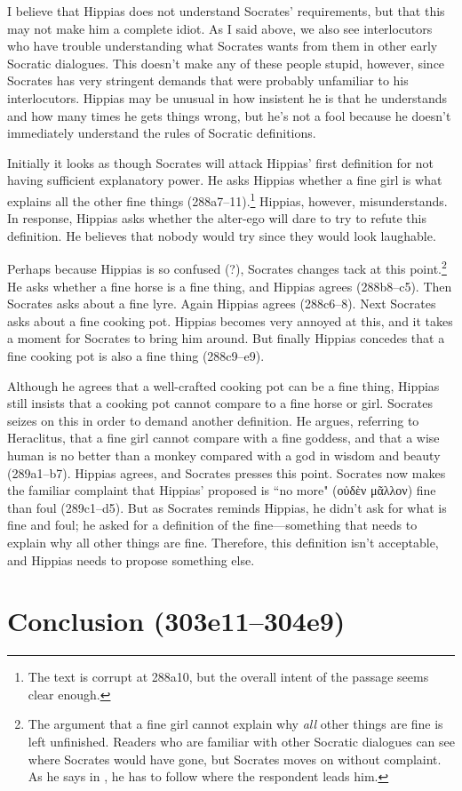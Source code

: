 \documentclass[11pt]{article}
\begin{document}
I believe that Hippias does not understand Socrates' requirements, but that this may not make him a complete idiot.  As I said above, we also see interlocutors who have trouble understanding what Socrates wants from them in other early Socratic dialogues.  This doesn't make any of these people stupid, however, since Socrates has very stringent demands that were probably unfamiliar to his interlocutors.  Hippias may be unusual in how insistent he is that he understands and how many times he gets things wrong, but he's not a fool because he doesn't immediately understand the rules of Socratic definitions.

Initially it looks as though Socrates will attack Hippias' first definition for not having sufficient explanatory power.  He asks Hippias whether a fine girl is what explains all the other fine things (288a7--11).\footnote{The text is corrupt at 288a10, but the overall intent of the passage seems clear enough.}  Hippias, however, misunderstands.  In response, Hippias asks whether the alter-ego will dare to try to refute this definition.  He believes that nobody would try since they would look laughable.

Perhaps because Hippias is so confused (?), Socrates changes tack at this point.\footnote{The argument that a fine girl cannot explain why \emph{all} other things are fine is left unfinished.  Readers who are familiar with other Socratic dialogues can see where Socrates would have gone, but Socrates moves on without complaint.  As he says in , he has to follow where the respondent leads him.}  He asks whether a fine horse is a fine thing, and Hippias agrees (288b8--c5).  Then Socrates asks about a fine lyre. Again Hippias agrees (288c6--8).  Next Socrates asks about a fine cooking pot.  Hippias becomes very annoyed at this, and it takes a moment for Socrates to bring him around.  But finally Hippias concedes that a fine cooking pot is also a fine thing (288c9--e9).

Although he agrees that a well-crafted cooking pot can be a fine thing, Hippias still insists that a cooking pot cannot compare to a fine horse or girl.  Socrates seizes on this in order to demand another definition.  He argues, referring to Heraclitus, that a fine girl cannot compare with a fine goddess, and that a wise human is no better than a monkey compared with a god in wisdom and beauty (289a1--b7).  Hippias agrees, and Socrates presses this point.  Socrates now makes the familiar complaint that Hippias' proposed  is ``no more" (οὐδὲν μᾶλλον) fine than foul (289c1--d5).  But as Socrates reminds Hippias, he didn't ask for what is fine and foul; he asked for a definition of the fine---something that needs to explain why all other things are fine.  Therefore, this definition isn't acceptable, and Hippias needs to propose something else.


\section{Conclusion (303e11--304e9)}




\newpage


\end{document}
